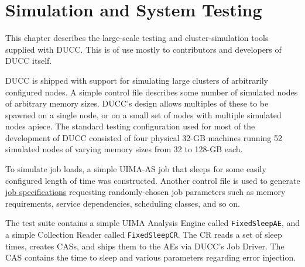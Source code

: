 % 
% 
% 
% 
\ifpdf
\else
{}
\fi
\chapter{Simulation and System Testing}
\label{chap:simulation}
    This chapter describes the large-scale testing and cluster-simulation 
    tools supplied with DUCC. This is of use mostly to contributors and 
    developers of DUCC itself.

    DUCC is shipped with support for simulating large clusters of arbitrarily 
    configured nodes.  A simple control file describes some number of
    simulated nodes of arbitrary memory sizes.  DUCC's design allows multiples
    of these to be spawned on a single node, or on a small set of nodes with 
    multiple simulated nodes apiece.  The standard testing configuration 
    used for most of the development of DUCC consisted of four
    physical 32-GB machines running 52 simulated nodes of varying memory
    sizes from 32 to 128-GB each.

    To simulate job loads, a simple UIMA-AS job that sleeps for some easily configured
    length of time was constructed.  Another control file is used to
    generate \hyperref[sec:cli.ducc-submit]{job specifications} requesting randomly-chosen
    job parameters such as memory requirements, service dependencies, scheduling classes, and so on.

    The test suite contains a simple UIMA Analysis Engine called
    {\tt FixedSleepAE}, and a simple Collection Reader called
    {\tt FixedSleepCR}.  The CR reads a set of sleep times, creates
    CASs, and ships them to the AEs via DUCC's Job Driver.  The CAS
    contains the time to sleep and various parameters regarding
    error injection.

